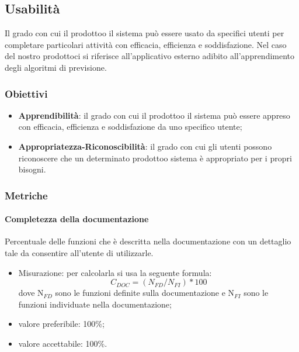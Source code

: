     \subsection{Usabilità}
        Il grado con cui il prodotto\glosp o il sistema può essere usato da specifici utenti per completare particolari attività con efficacia, efficienza e soddisfazione. Nel caso del nostro prodotto\glosp ci si riferisce all'applicativo esterno adibito all'apprendimento degli algoritmi di previsione.
        \subsubsection{Obiettivi}
            \begin{itemize}
                \item \textbf{Apprendibilità}: il grado con cui il prodotto\glosp o il sistema può essere appreso con efficacia, efficienza e soddisfazione da uno specifico utente;
                \item \textbf{Appropriatezza-Riconoscibilità}: il grado con cui gli utenti possono riconoscere che un determinato prodotto\glosp o sistema è appropriato per i propri bisogni.
            \end{itemize}
        \subsubsection{Metriche}
            \paragraph{Completezza della documentazione}
                Percentuale delle funzioni che è descritta nella documentazione con un dettaglio tale da consentire all’utente di utilizzarle.
                \begin{itemize}
                    \item Misurazione: per calcolarla si usa la seguente formula:
                    \[C_{DOC}=(N_{FD}/N_{FI})*100\]
                    dove N$_{FD}$ sono le funzioni definite sulla documentazione e N$_{FI}$ sono le funzioni individuate nella documentazione;
                    \item valore preferibile: 100\%;
                    \item valore accettabile: 100\%.
                \end{itemize}
